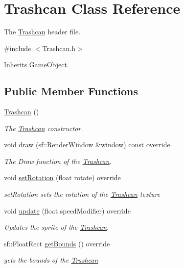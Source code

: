 \hypertarget{class_trashcan}{\section{Trashcan Class Reference}
\label{class_trashcan}
}


The \hyperlink{class_trashcan}{Trashcan} header file.  




{\ttfamily \#include $<$Trashcan.\+h$>$}



Inherits \hyperlink{class_game_object}{Game\+Object}.

\subsection*{Public Member Functions}
\begin{DoxyCompactItemize}
\item 
\hyperlink{class_trashcan_a2ed97239469f8fe39dd81fb00a270319}{Trashcan} ()
\begin{DoxyCompactList}\small\item\em The \hyperlink{class_trashcan}{Trashcan} constructor. \end{DoxyCompactList}\item 
void \hyperlink{class_trashcan_a25dfd8dbd49f4b43144f873451743050}{draw} (sf\+::\+Render\+Window \&window) const override
\begin{DoxyCompactList}\small\item\em The Draw function of the \hyperlink{class_trashcan}{Trashcan}. \end{DoxyCompactList}\item 
void \hyperlink{class_trashcan_abd57bce536a5bdabc9121836d8f78e6d}{set\+Rotation} (float rotate) override
\begin{DoxyCompactList}\small\item\em set\+Rotation sets the rotation of the \hyperlink{class_trashcan}{Trashcan} texture \end{DoxyCompactList}\item 
void \hyperlink{class_trashcan_a6d44d844ec5c4155158b4e4d5fc222a4}{update} (float speed\+Modifier) override
\begin{DoxyCompactList}\small\item\em Updates the sprite of the \hyperlink{class_trashcan}{Trashcan}. \end{DoxyCompactList}\item 
sf\+::\+Float\+Rect \hyperlink{class_trashcan_a2f3f2159749141665d9c71547474b9f2}{get\+Bounds} () override
\begin{DoxyCompactList}\small\item\em gets the bounds of the \hyperlink{class_trashcan}{Trashcan} \end{DoxyCompactList}\end{DoxyCompactItemize}
